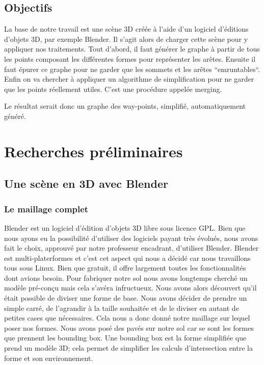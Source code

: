 \documentclass[a4paper,12pt]{report}
\begin{document}
\section*{Objectifs}

La base de notre travail est une scène 3D créée à l'aide d'un logiciel d'éditions d'objets 3D, par exemple Blender. Il s'agit alors de charger cette scène pour y appliquer nos traitements. Tout d'abord, il faut générer le graphe à partir de tous les points composant les différentes formes pour représenter les arêtes. Ensuite il faut épurer ce graphe pour ne garder que les sommets et les arêtes ``emruntables``. Enfin on va chercher à appliquer un algorithme de simplification pour ne garder que les points réellement utiles. C'est une procédure appelée merging.

Le résultat serait donc un graphe des way-points, simplifié, automatiquement généré.

\newpage

\chapter{Recherches préliminaires}

\section{Une scène en 3D avec Blender}


\subsection{Le maillage complet}
Blender est un logiciel d'édition d'objets 3D libre sous licence GPL. Bien que nous ayons eu la possibilité d'utiliser des logiciels payant très évolués, nous avons fait le choix, approuvé par notre professeur encadrant, d'utiliser Blender. Blender est multi-platerformes et c'est cet aspect qui nous a décidé car nous travaillons tous sous Linux. Bien que gratuit, il offre largement toutes les fonctionnalités dont avions besoin.
Pour fabriquer notre sol nous avons longtemps cherché un modèle pré-conçu mais cela s'avéra infructueux.
Nous avons alors découvert qu'il était possible de diviser une forme de base. Nous avons décider de prendre un simple carré, de l'agrandir à la taille souhaitée et de le diviser en autant de petites cases que nécessaires. Cela nous a donc donné notre maillage sur lequel poser nos formes.
Nous avons posé des pavés sur notre sol car se sont les formes que prennent les bounding box. Une bounding box est la forme simplifiée que prend un modèle 3D; cela permet de simplifier les calculs d'intersection entre la forme et son environnement.
\end{document}
